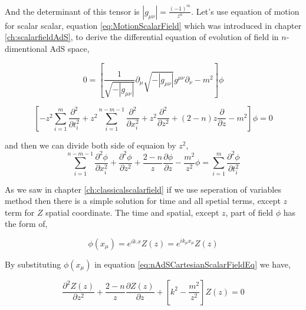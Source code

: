 And the determinant of this tensor is $|g_{\mu\nu}| = \frac{(-1)^{m}}{z^n}$. Let's use equation of motion for scalar scalar, equation \ref{eq:MotionScalarField} which was introduced in chapter \ref{ch:scalarfieldAdS}, to derive the differential equation of evolution of field in $n$-dimentional AdS space, 

\begin{equation} \label{eq:MotionScalarField}
    0 = \left[ \frac{1}{\sqrt{-|g_{\mu\nu}|}} \partial_\mu \sqrt{-|g_{\mu\nu}|} g^{\mu\nu} \partial_\nu - m^2 \right] \phi
\end{equation}

\begin{equation}
    \left[ -z^2 \sum\limits_{i=1}^{m} \frac{\partial^2}{\partial t_i^2} + z^2 \sum\limits_{i=1}^{n-m-1} \frac{\partial^2}{\partial x_i^2} + z^2 \frac{\partial^2}{\partial z^2} + (2-n) z \frac{\partial}{\partial z} - m^2 \right] \phi=0
\end{equation}

and then we can divide both side of equaion by $z^2$,\\

\begin{equation} \label{eq:nAdSCartesianScalarFieldEq}
    \sum\limits_{i=1}^{n-m-1} \frac{\partial^2\phi}{\partial x_i^2} + \frac{\partial^2\phi}{\partial z^2} + \frac{2-n}{z} \frac{\partial\phi}{\partial z} - \frac{m^2}{z^2}\phi = \sum\limits_{i=1}^{m}\frac{\partial^2 \phi}{\partial t_i^2}
\end{equation}

As we saw in chapter \ref{ch:classicalscalarfield} if we use seperation of variables method then there is a simple solution for time and all spetial terms, except $z$ term for $Z$ spatial coordinate. The time and spatial, except $z$, part of field $\phi$ has the form of,

\begin{equation}
    \phi(x_{\mu}) = e^{ik.x}Z(z) = e^{ik_{\mu}x_{\mu}}Z(z)
\end{equation}

By substituting $\phi(x_{\mu})$ in equation \ref{eq:nAdSCartesianScalarFieldEq} we have,

\begin{equation}\label{eq:ZnAdSCartesianScalarFieldEq}
    \frac{\partial^2Z(z)}{\partial z^2} + \frac{2-n}{z} \frac{\partial Z(z)}{\partial z} + \left[k^2 - \frac{m^2}{z^2} \right]Z(z) = 0
\end{equation}

